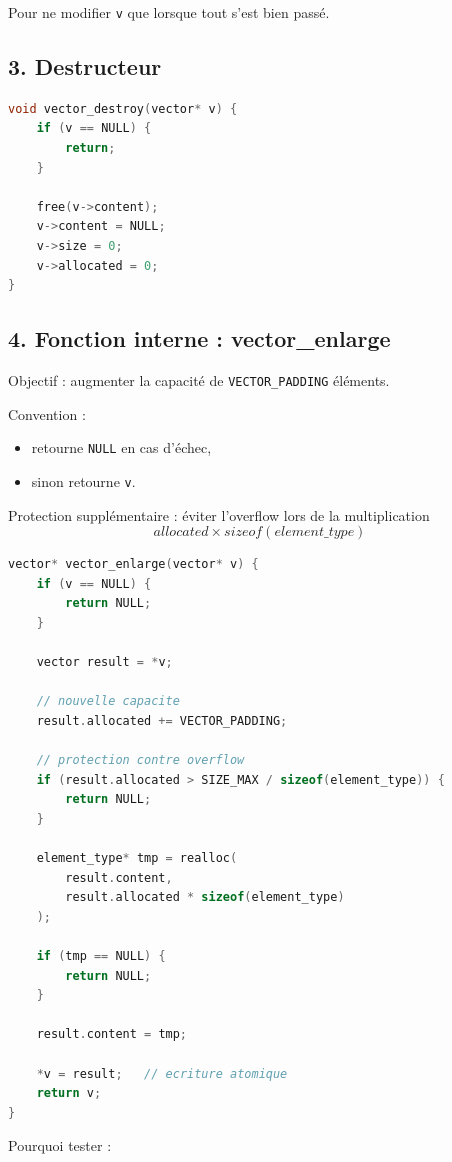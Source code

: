 Pour ne modifier \texttt{v} que lorsque tout s’est bien passé.

\subsection{3. Destructeur}

\begin{lstlisting}[language=C]
void vector_destroy(vector* v) {
    if (v == NULL) {
        return;
    }

    free(v->content);
    v->content = NULL;
    v->size = 0;
    v->allocated = 0;
}
\end{lstlisting}

\subsection{4. Fonction interne : vector\_enlarge}

Objectif :
augmenter la capacité de \texttt{VECTOR\_PADDING} éléments.

Convention :
\begin{itemize}
    \item retourne \texttt{NULL} en cas d’échec,
    \item sinon retourne \texttt{v}.
\end{itemize}

Protection supplémentaire :
éviter l’overflow lors de la multiplication
\[
allocated \times sizeof(element\_type)
\]

\begin{lstlisting}[language=C]
vector* vector_enlarge(vector* v) {
    if (v == NULL) {
        return NULL;
    }

    vector result = *v;

    // nouvelle capacite
    result.allocated += VECTOR_PADDING;

    // protection contre overflow
    if (result.allocated > SIZE_MAX / sizeof(element_type)) {
        return NULL;
    }

    element_type* tmp = realloc(
        result.content,
        result.allocated * sizeof(element_type)
    );

    if (tmp == NULL) {
        return NULL;
    }

    result.content = tmp;

    *v = result;   // ecriture atomique
    return v;
}
\end{lstlisting}

Pourquoi tester :


